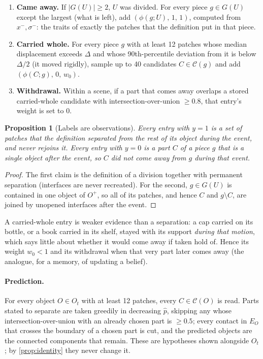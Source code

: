 \documentclass[10pt]{article}
\newtheorem{proposition}{Proposition}
\newcommand{\cand}{\mathcal{C}}
\begin{document}
\begin{enumerate}
\item \textbf{Came away.} If $|G(U)|\ge2$, $U$ was divided. For every piece $g\in G(U)$ except the largest (what is left), add $(\phi(g;U),\,1,\,1)$, computed from $x^-,\sigma^-$: the traits of exactly the patches that the definition put in that piece.
\item \textbf{Carried whole.} For every piece $g$ with at least 12 patches whose median displacement exceeds $\Delta$ and whose 90th-percentile deviation from it is below $\Delta/2$ (it moved rigidly), sample up to 40 candidates $C\in\cand(g)$ and add $(\phi(C;g),\,0,\,w_0)$.
\item \textbf{Withdrawal.} Within a scene, if a part that comes away overlaps a stored carried-whole candidate with intersection-over-union $\ge0.8$, that entry's weight is set to $0$.
\end{enumerate}

\begin{proposition}[Labels are observations]\label{prop:labels}
Every entry with $y=1$ is a set of patches that the definition separated from the rest of its object during the event, and never rejoins it. Every entry with $y=0$ is a part $C$ of a piece $g$ that is a single object after the event, so $C$ did not come away from $g$ during that event.
\end{proposition}
\begin{proof}
The first claim is the definition of a division together with permanent separation (interfaces are never recreated). For the second, $g\in G(U)$ is contained in one object of $O^+$, so all of its patches, and hence $C$ and $g\setminus C$, are joined by unopened interfaces after the event.
\end{proof}

A carried-whole entry is weaker evidence than a separation: a cap carried on its bottle, or a book carried in its shelf, stayed with its support \emph{during that motion}, which says little about whether it would come away if taken hold of. Hence its weight $w_0<1$ and its withdrawal when that very part later comes away (the analogue, for a memory, of updating a belief).

\paragraph{Prediction.} For every object $O\in O_t$ with at least 12 patches, every $C\in\cand(O)$ is read. Parts stated to separate are taken greedily in decreasing $\hat p$, skipping any whose intersection-over-union with an already chosen part is $\ge0.5$; every contact in $E_O$ that crosses the boundary of a chosen part is cut, and the predicted objects are the connected components that remain. These are hypotheses shown alongside $O_t$; by \cref{prop:identity} they never change it.
\end{document}
